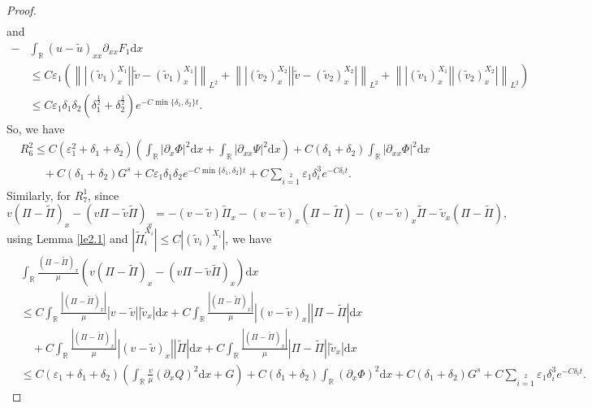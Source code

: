 \documentclass[10pt,a4paper]{amsart}
\newcommand{\dif}{\mathrm{d}}
\begin{document}
\begin{proof}
\begin{align*}
\end{align*}
and
\begin{align*}
-&\int_{\mathbb{R}}(u-\widetilde{u})_{xx}\partial_{xx}F_1\dif x\\
&\le C\varepsilon_1 \left(\left\||(\widetilde{v}_1)^{X_1}_x||\widetilde{v}-(\widetilde{v}_1)^{X_1}_x|\right\|_{L^2}
+\left\||(\widetilde{v}_2)^{X_2}_x||\widetilde{v}-(\widetilde{v}_2)^{X_2}_x|\right\|_{L^2}
+\left\||(\widetilde{v}_1)^{X_1}_x||(\widetilde{v}_2)^{X_2}_x|\right\|_{L^2}\right)\\
&\le C\varepsilon_1\delta_1\delta_2(\delta_1^{\frac{1}{2}}+\delta_2^{\frac{1}{2}})
e^{-C\min\{\delta_1,\delta_2\}t}.
\end{align*}
So, we have
\begin{align*}
&R_6^2\le C(\varepsilon_1^2+\delta_1+\delta_2)\left(\int_\mathbb{R}|\partial_{x}\Phi|^2\dif x
+\int_\mathbb{R}|\partial_{xx}\Psi|^2\dif x\right)
  +C(\delta_1+\delta_2)\int_\mathbb{R}|\partial_{xx}\Phi|^2\dif x\\
   &\qquad+C(\delta_1+\delta_2)G^s
  +C\varepsilon_1\delta_1\delta_2e^{-C\min\{\delta_1,\delta_2\}t}+C\sum\limits_{i=1}\limits^2\varepsilon_1 \delta_i^3e^{-C\delta_i t}.
\end{align*}
Similarly, for $R_7^1$, since
\[
v(\Pi-\widetilde{\Pi})_{x}-(v\Pi-\widetilde{v}\widetilde{\Pi})_{x}=-(v-\widetilde{v})\widetilde{\Pi}_{x}
-(v-\widetilde{v})_{x}(\Pi-\widetilde{\Pi})
-(v-\widetilde{v})_{x}\widetilde{\Pi}-\widetilde{v}_{x}(\Pi-\widetilde{\Pi}),
\]
using Lemma \ref{le2.1} and $|\widetilde{\Pi}_i^{X_i}|\le C|(\widetilde{v}_i)^{X_i}_x|$, we have
\begin{align*}
 &\int_\mathbb{R}\frac{(\Pi-\widetilde{\Pi})_{x}}{\mu}
 \left(v(\Pi-\widetilde{\Pi})_{x}-(v\Pi-\widetilde{v}\widetilde{\Pi})_{x}\right)\dif x\\
 &\le C\int_\mathbb{R}\frac{|(\Pi-\widetilde{\Pi})_{x}|}{\mu}|v-\widetilde{v}||\widetilde{v}_{x}|\dif x
 + C\int_\mathbb{R}\frac{|(\Pi-\widetilde{\Pi})_{x}|}{\mu}|(v-\widetilde{v})_{x}||\Pi-\widetilde{\Pi}|\dif x\\
 &\quad+ C\int_\mathbb{R}\frac{|(\Pi-\widetilde{\Pi})_{x}|}{\mu}|(v-\widetilde{v})_{x}||\widetilde{\Pi}|\dif x
 + C\int_\mathbb{R}\frac{|(\Pi-\widetilde{\Pi})_{x}|}{\mu}|\Pi-\widetilde{\Pi}||\widetilde{v}_x|\dif x\\
 &\le C(\varepsilon_1+\delta_1+\delta_2)\left(\int_\mathbb{R}\frac{v}{\mu}(\partial_xQ)^2\dif x+G\right)
 +C(\delta_1+\delta_2)\int_\mathbb{R}(\partial_x\Phi)^2\dif x
 +C(\delta_1+\delta_2)G^s
 +C\sum\limits_{i=1}\limits^2\varepsilon_1 \delta_i^3e^{-C\delta_i t}.

\end{align*}
\end{proof}
\end{document}
